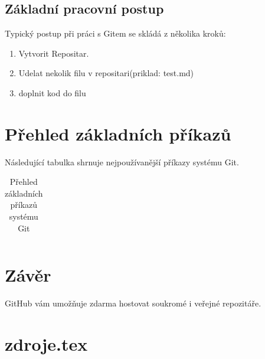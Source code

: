 \subsection{Základní pracovní postup}

Typický postup při práci s Gitem se skládá z několika kroků:

\begin{enumerate}
    \item Vytvorit Repositar.
    \item Udelat nekolik filu v repositari(priklad: test.md)
    \item doplnit kod do filu
\end{enumerate}

\section{Přehled základních příkazů}

Následující tabulka shrnuje nejpoužívanější příkazy systému Git.

\begin{table}[h]
    \centering
    \begin{tabular}{|l|p{8cm}|}
        
    \end{tabular}
    \caption{Přehled základních příkazů systému Git}
    \label{tab:git}
\end{table}

\section{Závěr}

GitHub vám umožňuje zdarma hostovat soukromé i veřejné repozitáře.

\section*{zdroje.tex}
